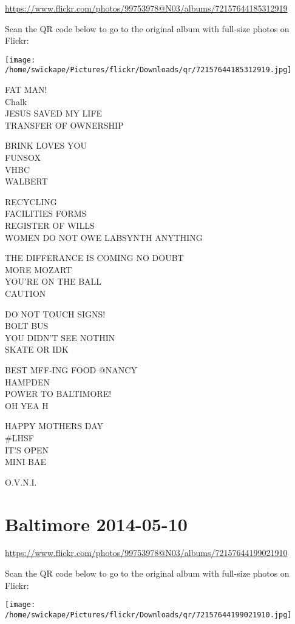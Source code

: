 \documentclass[10pt,letterpaper]{article}
\begin{document}
\url{https://www.flickr.com/photos/99753978@N03/albums/72157644185312919}

Scan the QR code below to go to the original album with full-size photos on Flickr:

\texttt{[image: /home/swickape/Pictures/flickr/Downloads/qr/72157644185312919.jpg]}


FAT MAN!\\
Chalk\\
JESUS SAVED MY LIFE\\
TRANSFER OF OWNERSHIP

BRINK LOVES YOU\\
FUNSOX\\
VHBC\\
WALBERT

RECYCLING\\
FACILITIES FORMS\\
REGISTER OF WILLS\\
WOMEN DO NOT OWE LABSYNTH ANYTHING

THE DIFFERANCE IS COMING NO DOUBT\\
MORE MOZART\\
YOU'RE ON THE BALL\\
CAUTION

DO NOT TOUCH SIGNS!\\
BOLT BUS\\
YOU DIDN'T SEE NOTHIN\\
SKATE OR IDK

BEST MFF{-}ING FOOD @NANCY\\
HAMPDEN\\
POWER TO BALTIMORE!\\
OH YEA H

HAPPY MOTHERS DAY\\
\#LHSF\\
IT'S OPEN\\
MINI BAE

O.V.N.I.


\section*{Baltimore 2014-05-10}

\url{https://www.flickr.com/photos/99753978@N03/albums/72157644199021910}

Scan the QR code below to go to the original album with full-size photos on Flickr:

\texttt{[image: /home/swickape/Pictures/flickr/Downloads/qr/72157644199021910.jpg]}
\end{document}
